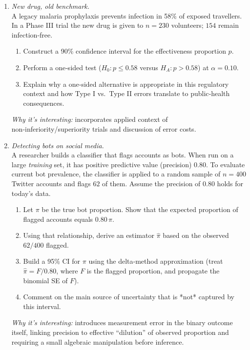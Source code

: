 \documentclass[11pt]{article}
\begin{document}
\begin{enumerate}[label=\textbf{Q\,\arabic*:}, left=0pt]
\item  \emph{New drug, old benchmark.}  \\
      A legacy malaria prophylaxis prevents infection in 58\% of exposed travellers.
      In a Phase III trial the new drug is given to $n=230$ volunteers; $154$ remain infection‑free.
      \begin{enumerate}[label=(\alph*)]
         \item Construct a 90\% confidence interval for the effectiveness proportion $p$.
         \item Perform a one‑sided test ($H_0{:}p\le0.58$ versus $H_A{:}p>0.58$) at $\alpha=0.10$.
         \item Explain why a one‑sided alternative is appropriate in this regulatory context and how Type I vs.\ Type II errors translate to public‑health consequences.
      \end{enumerate}
      \textit{Why it’s interesting:}  incorporates applied context of non‑inferiority/superiority trials and discussion of error costs.

\item  \emph{Detecting bots on social media.}  \\
      A researcher builds a classifier that flags accounts as bots.
      When run on a large \emph{training} set, it has positive predictive value (precision) 0.80.
      To evaluate current bot prevalence, the classifier is applied to a random sample of $n=400$ Twitter accounts and flags $62$ of them.
      Assume the precision of 0.80 holds for today’s data.
      \begin{enumerate}[label=(\alph*)]
         \item Let $\pi$ be the true bot proportion.  Show that the expected proportion of flagged accounts equals $0.80\,\pi$.
         \item Using that relationship, derive an estimator $\widehat{\pi}$ based on the observed $62/400$ flagged.
         \item Build a 95\% CI for $\pi$ using the delta‐method approximation (treat $\widehat{\pi}=F/0.80$, where $F$ is the flagged proportion, and propagate the binomial SE of $F$).
         \item Comment on the main source of uncertainty that is *not* captured by this interval.
      \end{enumerate}
      \textit{Why it’s interesting:}  introduces measurement error in the binary outcome itself, linking precision to effective “dilution” of observed proportion and requiring a small algebraic manipulation before inference.

\end{enumerate}
\end{document}
